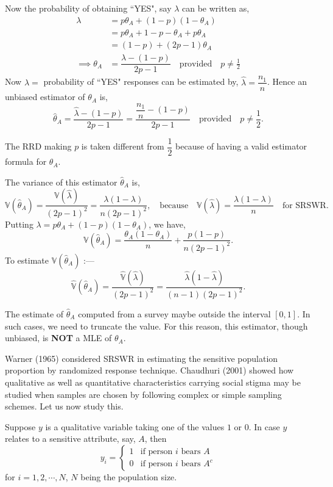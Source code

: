 \documentclass[12pt]{article}
\newcommand{\Var}{\mathbb{V}}
\theoremstyle{definition}
\newenvironment{note}{
\begin{tcolorbox}[colback=blue!5!white,colframe=blue!75!black,title=Note, parbox = false] }{\end{tcolorbox} }
\begin{document}
Now the probability of obtaining ``YES", say $\lambda$ can be written as,
\begin{align*}
    \lambda & = p \theta_A +(1-p)(1-\theta_A)\\
    & = p\theta_A + 1- p - \theta_A +p \theta_A \\
    & = (1-p) + (2p-1)\theta_A \\
    \implies \theta_A & = \dfrac{\lambda -(1-p)}{2p-1} \quad \text{provided} \quad p\neq \frac{1}{2}
\end{align*}
Now $\lambda=$ probability of ``YES" responses can be estimated by, $\hat{\lambda}=\dfrac{n_1}{n}$. Hence an unbiased estimator of $\theta_A$ is,
$$\hat{\theta}_A=\dfrac{\hat{\lambda} -(1-p)}{2p-1}=\dfrac{\dfrac{n_1}{n} -(1-p)}{2p-1} \quad \text{provided} \quad p\neq \frac{1}{2}.$$
\begin{note}
The RRD making $p$ is taken different from $\dfrac{1}{2}$ because of having a valid estimator formula for $\theta_A$.
\end{note}
The variance of this estimator $\hat{\theta}_A$ is,
$$\Var(\hat{\theta}_A)=\dfrac{\Var(\hat{\lambda})}{(2p-1)^2}=\dfrac{\lambda(1-\lambda)}{n(2p-1)^2},\quad \text{because}\quad \Var(\hat{\lambda})=\dfrac{\lambda(1-\lambda)}{n}\quad \text{for SRSWR.}$$
Putting $\lambda= p\theta_A +(1-p)(1-\theta_A)$, we have,
$$\Var(\hat{\theta}_A)=\dfrac{\theta_A(1-\theta_A)}{n}+\dfrac{p(1-p)}{n(2p-1)^2}.$$
To estimate $\Var(\hat{\theta}_A)$ :---
$$\hat{\Var}(\hat{\theta}_A)=\dfrac{\hat{\Var}(\hat{\lambda})}{(2p-1)^2}=\dfrac{\hat{\lambda}(1-\hat{\lambda})}{(n-1)(2p-1)^2}.$$
\begin{note}
The estimate of $\hat{\theta}_A$ computed from a survey maybe outside the interval $[0,1]$. In such cases, we need to truncate the value. For this reason, this estimator, though unbiased, is \textbf{NOT} a MLE of $\theta_A$.
\end{note}
Warner (1965) considered SRSWR in estimating the sensitive population proportion by randomized response technique. Chaudhuri (2001) showed how qualitative as well as quantitative characteristics carrying social stigma may be studied when samples are chosen by following complex or simple sampling schemes. Let us now study this.

Suppose $y$ is a qualitative variable taking one of the values $1$ or $0$. In case $y$ relates to a sensitive attribute, say, $A$, then
$$y_i= 
\begin{cases}
1 & \text{if person $i$ bears $A$} \\
0 & \text{if person $i$ bears $A^c$}
\end{cases}$$
for $i=1,2,\cdots,N$, $N$ being the population size.
\end{document}
